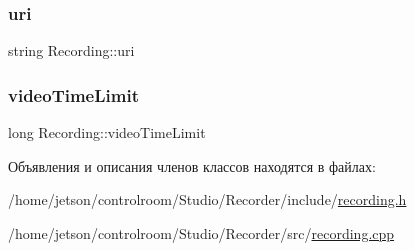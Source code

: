\subsubsection{\texorpdfstring{uri}{uri}}
{\footnotesize\ttfamily string Recording\+::uri}

\mbox{\label{class_recording_a222cf4edc0c19920121639525e6975e3}} 
\subsubsection{\texorpdfstring{video\+Time\+Limit}{videoTimeLimit}}
{\footnotesize\ttfamily long Recording\+::video\+Time\+Limit\hspace{0.3cm}{\ttfamily [private]}}



Объявления и описания членов классов находятся в файлах\+:\begin{DoxyCompactItemize}
\item 
/home/jetson/controlroom/\+Studio/\+Recorder/include/\hyperlink{recording_8h}{recording.\+h}\item 
/home/jetson/controlroom/\+Studio/\+Recorder/src/\hyperlink{recording_8cpp}{recording.\+cpp}\end{DoxyCompactItemize}
